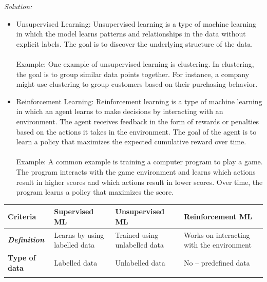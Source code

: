 \documentclass[a4paper, 11pt]{article}
\newenvironment{solution}
    {\textit{Solution:}}
    {}
\begin{document}
{\begin{solution}
\begin{itemize}
	Example: One example of supervised learning is image classification. The goal is to classify images into different categories. The model is trained on a set of labeled images and learns to recognize patterns in the images that correspond to different categories.
	\item Unsupervised Learning: Unsupervised learning is a type of machine learning in which the model learns patterns and relationships in the data without explicit labels. The goal is to discover the underlying structure of the data.\\\\
	Example: One example of unsupervised learning is clustering. In clustering, the goal is to group similar data points together. For instance, a company might use clustering to group customers based on their purchasing behavior.
	\item Reinforcement Learning: Reinforcement learning is a type of machine learning in which an agent learns to make decisions by interacting with an environment. The agent receives feedback in the form of rewards or penalties based on the actions it takes in the environment. The goal of the agent is to learn a policy that maximizes the expected cumulative reward over time.\\\\
	Example: A common example is training a computer program to play a game. The program interacts with the game environment and learns which actions result in higher scores and which actions result in lower scores. Over time, the program learns a policy that maximizes the score.
\end{itemize}
\begin{table}[h]
	\begin{tabularx}{\textwidth}{|X|X|X|X|}
		\hline \centering
		\textbf{Criteria}             & \textbf{Supervised ML}                                & \textbf{Unsupervised ML}                                                & \textbf{Reinforcement ML}                                     \\ \hline \centering
		\textit{\textbf{Definition}}  & Learns by using labelled data                         & Trained using unlabelled data                      & Works on interacting with the environment                     \\ \hline \centering
		\textbf{Type of data}         & Labelled data                                         & Unlabelled data                                                         & No – predefined data                                          \\ \hline \centering

\end{tabularx}
\end{table}
\end{solution}}
\end{document}
